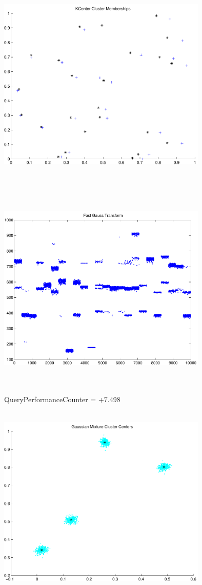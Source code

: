 \documentclass[9pt]{article}
\theoremstyle{plain}
\theoremstyle{definition}
\theoremstyle{remark}
\numberwithin{equation}{section}
\begin{document}
\includegraphics[width=10.0cm,height=10.0cm]{KCenterClusterMemberships_24_Centers.pdf}

\includegraphics[width=10.0cm,height=10.0cm]{FGT24_Centers.pdf}

QueryPerformanceCounter  =  +7.498
\includegraphics[width=10.0cm,height=10.0cm]{GaussianMixture_ClusterCenters4_Centers.pdf}
\end{document}
